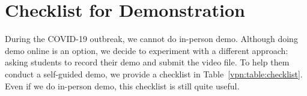 \section{Checklist for Demonstration}


During the COVID-19 outbreak, we cannot do in-person demo. Although doing demo
online is an option, we decide to experiment with a different approach: asking students to 
record their demo and submit the video file. To help them conduct a self-guided demo,
we provide a checklist in Table~\ref{vpn:table:checklist}. Even if we do in-person demo, this checklist 
is still quite useful. 







